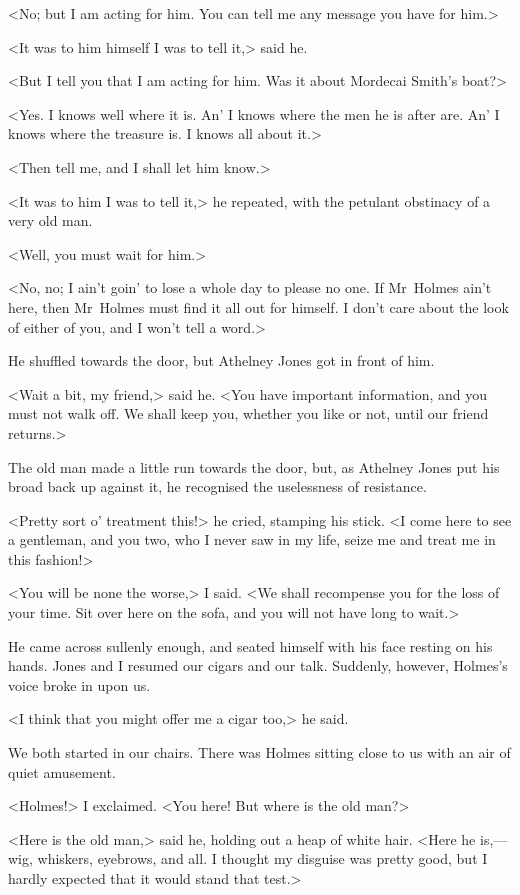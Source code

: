 <No; but I am acting for him. You can tell me any message you have for him.>

<It was to him himself I was to tell it,> said he.

<But I tell you that I am acting for him. Was it about Mordecai Smith's boat?>

<Yes. I knows well where it is. An' I knows where the men he is after are. An' I knows where the treasure is. I knows all about it.>

<Then tell me, and I shall let him know.>

<It was to him I was to tell it,> he repeated, with the petulant obstinacy of a very old man.

<Well, you must wait for him.>

<No, no; I ain't goin' to lose a whole day to please no one. If Mr~Holmes ain't here, then Mr~Holmes must find it all out for himself. I don't care about the look of either of you, and I won't tell a word.>

He shuffled towards the door, but Athelney Jones got in front of him.

<Wait a bit, my friend,> said he. <You have important information, and you must not walk off. We shall keep you, whether you like or not, until our friend returns.>

The old man made a little run towards the door, but, as Athelney Jones put his broad back up against it, he recognised the uselessness of resistance.

<Pretty sort o' treatment this!> he cried, stamping his stick. <I come here to see a gentleman, and you two, who I never saw in my life, seize me and treat me in this fashion!>

<You will be none the worse,> I said. <We shall recompense you for the loss of your time. Sit over here on the sofa, and you will not have long to wait.>

He came across sullenly enough, and seated himself with his face resting on his hands. Jones and I resumed our cigars and our talk. Suddenly, however, Holmes's voice broke in upon us.

<I think that you might offer me a cigar too,> he said.

We both started in our chairs. There was Holmes sitting close to us with an air of quiet amusement.

<Holmes!> I exclaimed. <You here! But where is the old man?>

<Here is the old man,> said he, holding out a heap of white hair. <Here he is,—wig, whiskers, eyebrows, and all. I thought my disguise was pretty good, but I hardly expected that it would stand that test.>

